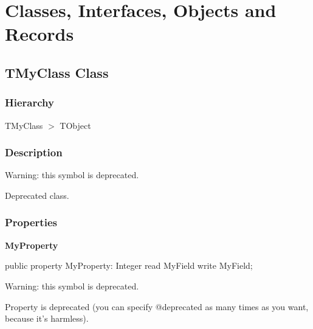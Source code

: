 \documentclass{report}
\newif\ifpdf
\begin{document}
\section{Classes, Interfaces, Objects and Records}
\ifpdf
\subsection*{\large{\textbf{TMyClass Class}}\normalsize\hspace{1ex}\hrulefill}
\else
\subsection*{TMyClass Class}
\fi
\label{ok_deprecated_tag.TMyClass}
\subsubsection*{\large{\textbf{Hierarchy}}\normalsize\hspace{1ex}\hfill}
TMyClass {$>$} TObject
\subsubsection*{\large{\textbf{Description}}\normalsize\hspace{1ex}\hfill}
Warning: this symbol is deprecated.

 Deprecated class.\subsubsection*{\large{\textbf{Properties}}\normalsize\hspace{1ex}\hfill}
\begin{list}{}{
\setlength{\itemindent}{0cm}
\setlength{\listparindent}{0cm}
\setlength{\leftmargin}{\evensidemargin}
\addtolength{\leftmargin}{\tmplength}
\settowidth{\labelsep}{X}
\addtolength{\leftmargin}{\labelsep}
\setlength{\labelwidth}{\tmplength}
}
\label{ok_deprecated_tag.TMyClass-MyProperty}
\item[\textbf{MyProperty}\hfill]
\ifpdf
\begin{flushleft}
\fi
\begin{ttfamily}
public property MyProperty: Integer read MyField write MyField;\end{ttfamily}

\ifpdf
\end{flushleft}
\fi


\par Warning: this symbol is deprecated.

    Property is deprecated (you can specify @deprecated as many times as you want, because it's harmless).\end{list}
\end{document}
